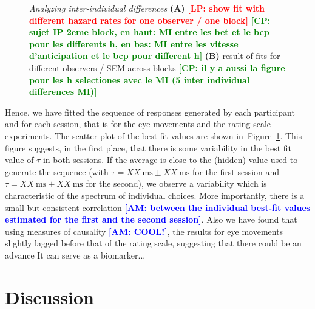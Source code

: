 \documentclass[12pt,english]{article}%
\newcommand{\ms}{\si{\milli\second}}%
\newcommand{\seeFig}[1]{Figure~\ref{fig:#1}}
\newcommand{\LP}[1]{\textbf{\textcolor{red}{[LP: #1]}}}
\newcommand{\AM}[1]{\textbf{\textcolor{blue}{[AM: #1]}}}
\newcommand{\CP}[1]{\textbf{\textcolor{green}{[CP: #1]}}}
\begin{document}
\begin{figure}
{
}


%
\caption{\emph{Analyzing inter-individual differences}
\textbf{(A)}
\LP{ show fit with different hazard rates for one observer / one block}
\CP{sujet IP 2eme block,  en haut: MI entre les bet et le bcp pour les differents h, en bas: MI entre les vitesse d'anticipation et le bcp pour different h}
\textbf{(B)}
result of fits for different observers / SEM across blocks
\CP{il y a aussi la figure pour les h selectiones avec le MI (5 inter individual differences MI)}
}
\label{fig:results_inter}
\end{figure}
Hence, we have fitted the sequence of responses generated by each participant and
for each session, that is for the eye movements and the rating scale experiments.
The scatter plot of the best fit values are shown in~\seeFig{results_inter}.
This figure suggests, in the first place, that there is some variability in the best fit value of $\tau$
in both sessions.
If the average is close to the (hidden) value used to generate the sequence
(with $\tau = XX~\ms \pm XX~\ms$ for the first session and
 $\tau = XX~\ms \pm XX~\ms$ for the second),
 we observe a variability which is characteristic of the spectrum of individual choices.
More importantly, there is a small but consistent
correlation \AM{between the individual best-fit values estimated for the first and the second session}.
Also we have found that using measures of causality \AM{COOL!},
the results for eye movements slightly lagged before
that of the rating scale,
suggesting that there could be an advance
It can serve as a biomarker...


\section{Discussion}
\end{document}
